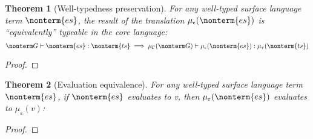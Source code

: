 \documentclass[a4paper]{article}
\newtheorem{theorem}{Theorem}
\begin{document}
\begin{theorem}[Well-typedness preservation]
  For any well-typed surface language term $\nonterm{es}$,
  the result of the translation $\mu_\epsilon(\nonterm{es})$ is ``equivalently'' typeable in the core language:
  \[
    \nonterm G \vdash \nonterm{es} : \nonterm{ts} \implies \mu_\Gamma(\nonterm G) \vdash \mu_\epsilon(\nonterm{es}) : \mu_\tau(\nonterm{ts})
  \]
\end{theorem}
\begin{proof}
\end{proof}

\begin{theorem}[Evaluation equivalence]
  For any well-typed surface language term $\nonterm{es}$, if $\nonterm{es}$ evaluates to v, then $\mu_\varepsilon(\nonterm{es})$ evaluates to $\mu_\varepsilon(v)$:
\end{theorem}
\begin{proof}
\end{proof}
\end{document}
